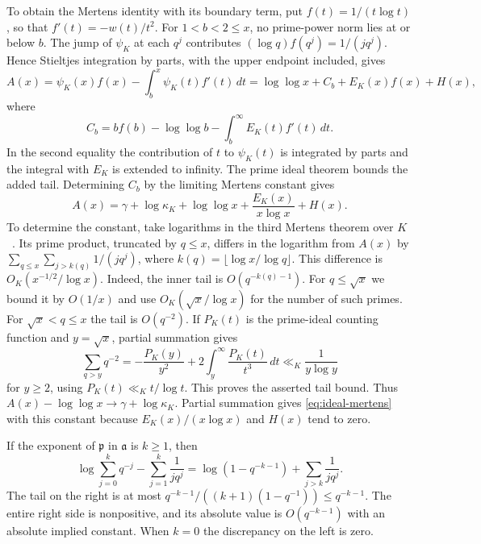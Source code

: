 \documentclass[11pt]{amsart}
\theoremstyle{definition}
\theoremstyle{remark}
\numberwithin{equation}{section}
\begin{document}
To obtain the Mertens identity with its boundary term, put
\(f(t)=1/(t\log t)\), so that \(f'(t)=-w(t)/t^2\).
For \(1<b<2\leq x\), no prime-power norm lies at or below \(b\).
The jump of \(\psi_K\) at each \(q^j\) contributes
\((\log q) f(q^j)=1/(j q^j)\). Hence Stieltjes integration by
parts, with the upper endpoint included, gives
\[
 A(x)=\psi_K(x)f(x)-\int_b^x\psi_K(t)f'(t)\,dt
     =\log\log x+C_b+E_K(x)f(x)+H(x),
\]
where
\[
 C_b=b f(b)-\log\log b-\int_b^\infty E_K(t) f'(t)\,dt .
\]
In the second equality the contribution of \(t\) to \(\psi_K(t)\)
is integrated by parts and the integral with \(E_K\) is extended to
infinity. The prime ideal theorem bounds the added tail. Determining
\(C_b\) by the limiting Mertens constant gives
\begin{equation}\label{eq:ideal-mertens}
 A(x)=\gamma+\log\kappa_K+\log\log x+
             \frac{E_K(x)}{x\log x}+H(x).
\end{equation}
To determine the constant, take logarithms in the third Mertens
theorem over \(K\)~\cite[Theorem 1]{GarciaLeeNumberFieldMertens}.
Its prime product, truncated by \(q\leq x\), differs in the
logarithm from \(A(x)\) by
\(\sum_{q\leq x}\sum_{j>k(q)}1/(jq^j)\), where
\(k(q)=\lfloor\log x/\log q\rfloor\). This difference is
\(O_K(x^{-1/2}/\log x)\). Indeed, the inner tail is
\(O(q^{-k(q)-1})\). For \(q\leq\sqrt{x}\) we bound it by \(O(1/x)\)
and use \(O_K(\sqrt{x}/\log x)\) for the number of such primes.
For \(\sqrt{x}<q\le x\) the tail is \(O(q^{-2})\).
If \(P_K(t)\) is the prime-ideal counting function and \(y=\sqrt{x}\),
partial summation gives
\[
 \sum_{q>y} q^{-2}
  =-\frac{P_K(y)}{y^2}+2\int_y^\infty \frac{P_K(t)}{t^3}\,dt
  \ll_K \frac1{y\log y}
\]
for \(y\ge2\), using \(P_K(t)\ll_K t/\log t\).
This proves the asserted tail bound. Thus
\(A(x)-\log\log x\longrightarrow\gamma+\log\kappa_K\).
Partial summation gives \eqref{eq:ideal-mertens} with this constant
because \(E_K(x)/(x\log x)\) and \(H(x)\) tend to zero.

If the exponent of \(\mathfrak p\) in \(\mathfrak a\) is \(k\geq1\),
then
\[
 \log\sum_{j=0}^k q^{-j}-\sum_{j=1}^k\frac{1}{jq^j}
 =\log(1-q^{-k-1})+\sum_{j>k}\frac{1}{jq^j}.
\]
The tail on the right is at most
\(q^{-k-1}/((k+1)(1-q^{-1}))\leq q^{-k-1}\).
The entire right side is nonpositive, and its absolute value is
\(O(q^{-k-1})\) with an absolute implied constant. When \(k=0\)
the discrepancy on the left is zero.
\end{document}
